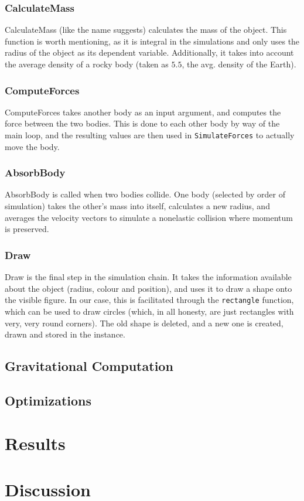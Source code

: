 \documentclass[11pt]{article}
\begin{document}
\subsubsection{CalculateMass}
CalculateMass (like the name suggests) calculates the mass of the object. This function is worth mentioning, as it is integral in the simulations and only uses the radius of the object as its dependent variable. Additionally, it takes into account the average density of a rocky body (taken as $5.5$, the avg. density of the Earth).
\subsubsection{ComputeForces}
ComputeForces takes another body as an input argument, and computes the force between the two bodies. This is done to each other body by way of the main loop, and the resulting values are then used in \verb|SimulateForces| to actually move the body.
\subsubsection{AbsorbBody}
AbsorbBody is called when two bodies collide. One body (selected by order of simulation) takes the other's mass into itself, calculates a new radius, and averages the velocity vectors to simulate a nonelastic collision where momentum is preserved.
\subsubsection{Draw}
Draw is the final step in the simulation chain. It takes the information available about the object (radius, colour and position), and uses it to draw a shape onto the visible figure. In our case, this is facilitated through the \verb|rectangle| function, which can be used to draw circles (which, in all honesty, are just rectangles with very, very round corners). The old shape is deleted, and a new one is created, drawn and stored in the instance.

\subsection{Gravitational Computation}\label{gravityComputeInfo}

\subsection{Optimizations}\label{optimizationInfo}


\section{Results}


\section{Discussion}

\printbibliography
\end{document}
